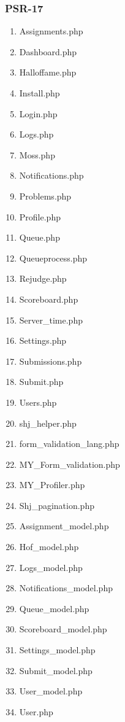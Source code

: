 \subsubsection{PSR-17}
\begin{enumerate}
	\item Assignments.php
	\item Dashboard.php
	\item Halloffame.php
	\item Install.php
	\item Login.php
	\item Logs.php
	\item Moss.php
	\item Notifications.php
	\item Problems.php
	\item Profile.php
	\item Queue.php
	\item Queueprocess.php
	\item Rejudge.php
	\item Scoreboard.php
	\item Server\_time.php
	\item Settings.php
	\item Submissions.php
	\item Submit.php
	\item Users.php
	\item shj\_helper.php
	\item form\_validation\_lang.php
	\item MY\_Form\_validation.php
	\item MY\_Profiler.php
	\item Shj\_pagination.php
	\item Assignment\_model.php
	\item Hof\_model.php
	\item Logs\_model.php
	\item Notifications\_model.php
	\item Queue\_model.php
	\item Scoreboard\_model.php
	\item Settings\_model.php
	\item Submit\_model.php
	\item User\_model.php
	\item User.php
\end{enumerate}


